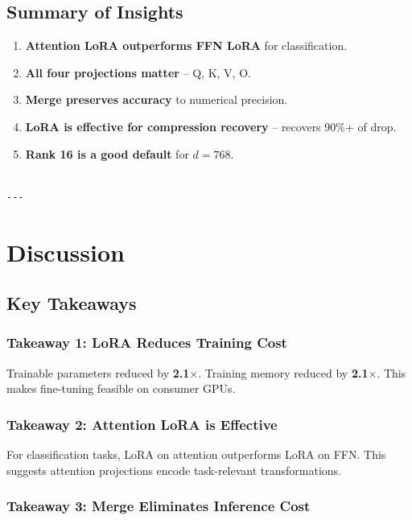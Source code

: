 \subsection{Summary of Insights}

\begin{enumerate}
\item \textbf{Attention LoRA outperforms FFN LoRA} for classification.
\item \textbf{All four projections matter} -- Q, K, V, O.
\item \textbf{Merge preserves accuracy} to numerical precision.
\item \textbf{LoRA is effective for compression recovery} -- recovers 90\%+ of drop.
\item \textbf{Rank 16 is a good default} for $d = 768$.
\end{enumerate}
\begin{lstlisting}

---
\end{lstlisting}

\section{Discussion}

\subsection{Key Takeaways}

\subsubsection{Takeaway 1: LoRA Reduces Training Cost}

Trainable parameters reduced by \textbf{2.1$\times$}. Training memory 
reduced by \textbf{2.1$\times$}. This makes fine-tuning feasible on consumer 
GPUs.

\subsubsection{Takeaway 2: Attention LoRA is Effective}

For classification tasks, LoRA on attention outperforms LoRA on FFN. This 
suggests attention projections encode task-relevant transformations.

\subsubsection{Takeaway 3: Merge Eliminates Inference Cost}

